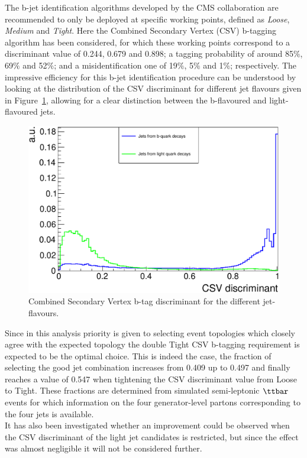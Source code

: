 The b-jet identification algorithms developed by the CMS collaboration are recommended to only be deployed at specific working points, defined as \textit{Loose}, \textit{Medium} and \textit{Tight}. 
Here the Combined Secondary Vertex (CSV) b-tagging algorithm has been considered, for which these working points correspond to a discriminant value of 0.244, 0.679 and 0.898; a tagging probability of around 85$\%$, 69$\%$ and 52$\%$; and a misidentification one of 19$\%$, 5$\%$ and 1$\%$; respectively.
The impressive efficiency for this b-jet identification procedure can be understood by looking at the distribution of the CSV discriminant for different jet flavours given in Figure~\ref{fig::CSVDiscr}, allowing for a clear distinction between the b-flavoured and light-flavoured jets.
\begin{figure}[h!t]
 \centering
 \includegraphics[width = 0.75 \textwidth]{Chapters/Chapter4_EvtSel/Figures/CSVDiscr_LightAndBJets.pdf}
 \caption{Combined Secondary Vertex b-tag discriminant for the different jet-flavours.} \label{fig::CSVDiscr}
\end{figure}

Since in this analysis priority is given to selecting event topologies which closely agree with the expected topology the double Tight CSV b-tagging requirement is expected to be the optimal choice.
This is indeed the case, the fraction of selecting the good jet combination increases from 0.409 up to 0.497 and finally reaches a value of 0.547 when tightening the CSV discriminant value from Loose to Tight. 
These fractions are determined from simulated semi-leptonic $\ttbar$ events for which information on the four generator-level partons corresponding to the four jets is available.
\\
It has also been investigated whether an improvement could be observed when the CSV discriminant of the light jet candidates is restricted, but since the effect was almost negligible it will not be considered further.
\\

